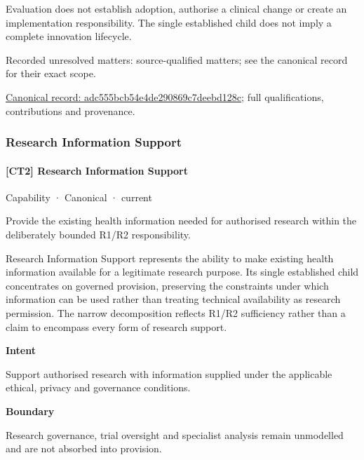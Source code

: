Evaluation does not establish adoption, authorise a clinical change or create an implementation responsibility. The single established child does not imply a complete innovation lifecycle.


{\small Recorded unresolved matters: source-qualified matters; see the canonical record for their exact scope.}\par
{\footnotesize \href{../../../../continuum/strategy/capability/adc555bcb54e4de290869c7deebd128c.md}{Canonical record: adc555bcb54e4de290869c7deebd128c}; full qualifications, contributions and provenance.}\par
\subsubsection{Research Information Support}

\paragraph{[CT2] Research Information Support}

\label{element:ef18f999eef3488ba584d263a551732b}
{\small Capability · Canonical · current}\par

Provide the existing health information needed for authorised research within the deliberately bounded R1/R2 responsibility.



Research Information Support represents the ability to make existing health information available for a legitimate research purpose. Its single established child concentrates on governed provision, preserving the constraints under which information can be used rather than treating technical availability as research permission. The narrow decomposition reflects R1/R2 sufficiency rather than a claim to encompass every form of research support.



\textbf{Intent}



Support authorised research with information supplied under the applicable ethical, privacy and governance conditions.



\textbf{Boundary}



Research governance, trial oversight and specialist analysis remain unmodelled and are not absorbed into provision.


